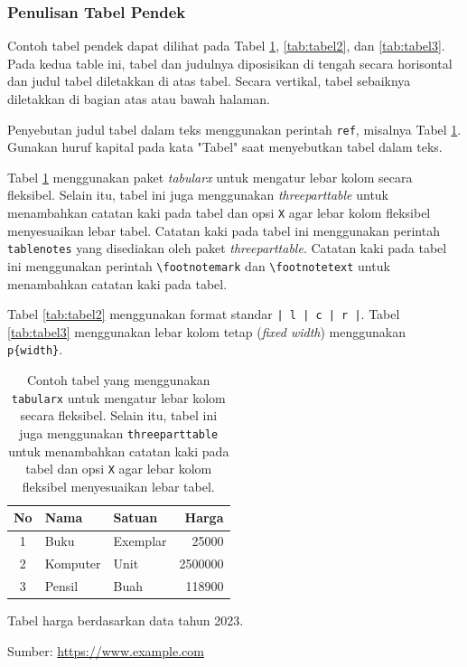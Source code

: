 \subsubsection{Penulisan Tabel Pendek}
Contoh tabel pendek dapat dilihat pada Tabel \ref{tab:tabel1}, \ref{tab:tabel2}, dan \ref{tab:tabel3}. 
Pada kedua table ini, tabel dan judulnya diposisikan di tengah secara horisontal dan 
judul tabel diletakkan di atas tabel. Secara vertikal, tabel sebaiknya diletakkan di bagian atas atau bawah halaman.

Penyebutan judul tabel dalam teks menggunakan perintah \texttt{ref}, misalnya Tabel \ref{tab:tabel1}.
Gunakan huruf kapital pada kata "Tabel" saat menyebutkan tabel dalam teks.

Tabel \ref{tab:tabel1} menggunakan paket \textit{tabularx} untuk mengatur lebar kolom secara fleksibel. 
Selain itu, tabel ini juga menggunakan \textit{threeparttable} untuk menambahkan catatan kaki pada tabel 
dan opsi \texttt{X} agar lebar kolom fleksibel menyesuaikan lebar tabel.
Catatan kaki pada tabel ini menggunakan perintah \texttt{tablenotes} yang disediakan oleh paket \textit{threeparttable}.
Catatan kaki pada tabel ini menggunakan perintah \texttt{\textbackslash footnotemark} dan \texttt{\textbackslash footnotetext} untuk menambahkan catatan kaki pada tabel.

Tabel \ref{tab:tabel2} menggunakan format standar \texttt{| l | c | r |}. 
Tabel \ref{tab:tabel3} menggunakan lebar kolom tetap (\textit{fixed width}) menggunakan \texttt{p\{width\}}.

\begin{table} 
  \centering
    \begin{threeparttable}[t] %
    \caption{Contoh tabel yang menggunakan \texttt{tabularx} untuk mengatur lebar kolom secara fleksibel. Selain itu, tabel ini juga menggunakan \texttt{threeparttable} untuk menambahkan catatan kaki pada tabel dan opsi \texttt{X} agar lebar kolom fleksibel menyesuaikan lebar tabel.}
    \label{tab:tabel1}
    \begin{tabularx}{0.6\textwidth}{| c | X| l | r @{}|} %
	    \hline
	    No & Nama 	& Satuan 		& Harga \\
	    \hline
	    1 & Buku 	& Exemplar	& 25000 \\
	    2 & Komputer	& Unit		& 2500000 \\
	    3 & Pensil	& Buah		& 118900 \\
	    \hline
	  \end{tabularx} 
    \begin{tablenotes}
      \footnotesize
      \item \footnotemark[1]Tabel harga berdasarkan data tahun 2023.
      \item \footnotemark[2]Sumber: \url{https://www.example.com}
    \end{tablenotes}
  \end{threeparttable}
\end{table}




